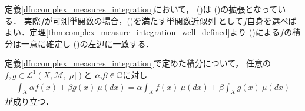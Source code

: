 	定義\ref{dfn:complex_measures_integration}において，
	()は
	()の拡張となっている．
	実際$f$が可測単関数の場合，()を満たす単関数近似列
	として$f$自身を選べばよい．定理\ref{thm:complex_measure_integration_well_defined}より
	()による$f$の積分は一意に確定し
	()の左辺に一致する．
	
	\begin{screen}
		\begin{thm}[積分の線型性]
			定義\ref{dfn:complex_measures_integration}で定めた積分について，
			任意の$f,g \in \mathscr{L}^1(X,\mathcal{M},|\mu|)$と
			$\alpha,\beta \in \mathbb{C}$に対し
			\begin{align}
				\int_X \alpha f(x) + \beta g(x)\ \mu(dx)
				= \alpha \int_X f(x)\ \mu(dx) + \beta \int_X g(x)\ \mu(dx)
			\end{align}
			が成り立つ．
			\label{thm:complex_measure_integral_linearity}
		\end{thm}
	\end{screen}
	
